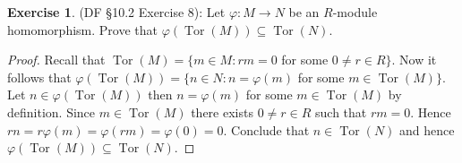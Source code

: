 \documentclass[8pt]{amsart}
\theoremstyle{plain}%
\theoremstyle{definition}
\newtheorem*{exercise}{Exercise}%
\theoremstyle{remark}
\numberwithin{equation}{section}
\begin{document}
\begin{exercise}
(DF \S 10.2 Exercise 8): Let $\varphi : M \to N$ be an $R$-module homomorphism. Prove that $\varphi(\operatorname{Tor}(M)) \subseteq \operatorname{Tor}(N)$.
	\begin{proof}
		Recall that $\operatorname{Tor}(M) = \{m \in M : rm = 0$ for some $0 \neq r \in R\}$. Now it follows that $\varphi(\operatorname{Tor}(M)) = \{n \in N : n = \varphi(m)$ for some $m \in \operatorname{Tor}(M)\}$. Let $n \in \varphi(\operatorname{Tor}(M))$ then $n = \varphi(m)$ for some $m \in \operatorname{Tor}(M)$ by definition. Since $m \in \operatorname{Tor}(M)$ there exists $0 \neq r \in R$ such that $rm = 0$. Hence $rn = r \varphi(m) = \varphi(rm) = \varphi(0) = 0$. Conclude that $n \in \operatorname{Tor}(N)$ and hence $\varphi(\operatorname{Tor}(M)) \subseteq \operatorname{Tor}(N)$.
	\end{proof}
\end{exercise}
\end{document}
